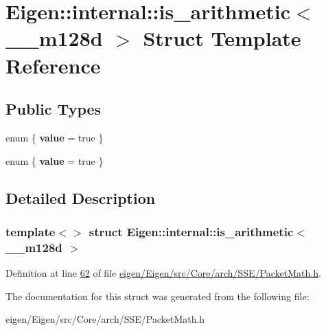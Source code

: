 \hypertarget{struct_eigen_1_1internal_1_1is__arithmetic_3_01____m128d_01_4}{}\section{Eigen\+:\+:internal\+:\+:is\+\_\+arithmetic$<$ \+\_\+\+\_\+m128d $>$ Struct Template Reference}
\label{struct_eigen_1_1internal_1_1is__arithmetic_3_01____m128d_01_4}
\subsection*{Public Types}
\begin{DoxyCompactItemize}
\item 
\mbox{\label{struct_eigen_1_1internal_1_1is__arithmetic_3_01____m128d_01_4_acc11826ec62ec8c54a5acf5726122087}} 
enum \{ {\bfseries value} = true
 \}
\item 
\mbox{\label{struct_eigen_1_1internal_1_1is__arithmetic_3_01____m128d_01_4_ad9ca2e454e4db009ec17dd3e1bd7c5e4}} 
enum \{ {\bfseries value} = true
 \}
\end{DoxyCompactItemize}


\subsection{Detailed Description}
\subsubsection*{template$<$$>$\newline
struct Eigen\+::internal\+::is\+\_\+arithmetic$<$ \+\_\+\+\_\+m128d $>$}



Definition at line \hyperlink{eigen_2_eigen_2src_2_core_2arch_2_s_s_e_2_packet_math_8h_source_l00062}{62} of file \hyperlink{eigen_2_eigen_2src_2_core_2arch_2_s_s_e_2_packet_math_8h_source}{eigen/\+Eigen/src/\+Core/arch/\+S\+S\+E/\+Packet\+Math.\+h}.



The documentation for this struct was generated from the following file\+:\begin{DoxyCompactItemize}
\item 
eigen/\+Eigen/src/\+Core/arch/\+S\+S\+E/\+Packet\+Math.\+h\end{DoxyCompactItemize}
